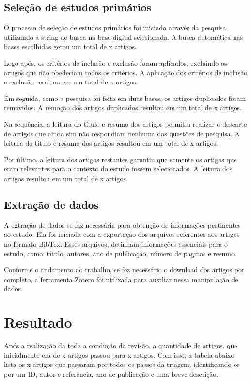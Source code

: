 \subsection{Seleção de estudos primários}

O processo de seleção de estudos primários foi iniciado através da pesquisa utilizando a string de busca na base digital selecionada. A busca automática nas bases escolhidas gerou um total de x artigos.

Logo após, os critérios de inclusão e exclusão foram aplicados, excluindo os artigos que não obedeciam todos os critérios. A aplicação dos critérios de inclusão e exclusão resultou em um total de x artigos.

Em seguida, como a pesquisa foi feita em duas bases, os artigos duplicados foram removidos. A remoção dos artigos duplicados resultou em um total de x artigos.

Na sequência, a leitura do título e resumo dos artigos permitiu realizar o descarte de artigos que ainda sim não respondiam nenhuma das questões de pesquisa. A leitura do título e resumo dos artigos resultou em um total de x artigos.

Por último, a leitura dos artigos restantes garantiu que somente os artigos que eram relevantes para o contexto do estudo fossem selecionados. A leitura dos artigos resultou em um total de x artigos.

\subsection{Extração de dados}

A extração de dados se faz necessária para obtenção de informações pertinentes ao estudo. Ela foi iniciada com a exportação dos arquivos referentes aos artigos no formato BibTex. Esses arquivos, detinham informações essenciais para o estudo, como: título, autores, ano de publicação, número de paginas e resumo.

Conforme o andamento do trabalho, se fez necessário o download dos artigos por completo, a ferramenta Zotero foi utilizada para auxiliar nessa manipulação de dados.

\section{Resultado}

Após a realização da toda a condução da revisão, a quantidade de artigos, que inicialmente era de x artigos passou para x artigos. Com isso, a tabela abaixo lista os x artigos que passaram por todos os passos da triagem, identificando-os por um ID, autor e referência, ano de publicação e uma breve descrição. 

